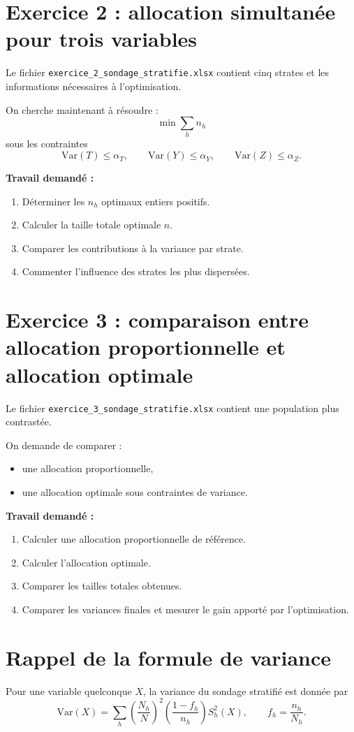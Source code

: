 \documentclass[11pt,a4paper]{article}
\begin{document}
\section{Exercice 2 : allocation simultanée pour trois variables}
Le fichier \texttt{exercice\_2\_sondage\_stratifie.xlsx} contient cinq strates et les informations nécessaires à l'optimisation.

On cherche maintenant à résoudre :
\[
\min \sum_h n_h
\]
sous les contraintes
\[
\mathrm{Var}(T) \leq \alpha_T, \qquad
\mathrm{Var}(Y) \leq \alpha_Y, \qquad
\mathrm{Var}(Z) \leq \alpha_Z.
\]

\textbf{Travail demandé :}
\begin{enumerate}[leftmargin=2em]
    \item Déterminer les $n_h$ optimaux entiers positifs.
    \item Calculer la taille totale optimale $n$.
    \item Comparer les contributions à la variance par strate.
    \item Commenter l'influence des strates les plus dispersées.
\end{enumerate}

\section{Exercice 3 : comparaison entre allocation proportionnelle et allocation optimale}
Le fichier \texttt{exercice\_3\_sondage\_stratifie.xlsx} contient une population plus contrastée.

On demande de comparer :
\begin{itemize}[leftmargin=2em]
    \item une allocation proportionnelle,
    \item une allocation optimale sous contraintes de variance.
\end{itemize}

\textbf{Travail demandé :}
\begin{enumerate}[leftmargin=2em]
    \item Calculer une allocation proportionnelle de référence.
    \item Calculer l'allocation optimale.
    \item Comparer les tailles totales obtenues.
    \item Comparer les variances finales et mesurer le gain apporté par l'optimisation.
\end{enumerate}

\section*{Rappel de la formule de variance}
Pour une variable quelconque $X$, la variance du sondage stratifié est donnée par
\[
\mathrm{Var}(X)
=
\sum_h
\left(\frac{N_h}{N}\right)^2
\left(\frac{1-f_h}{n_h}\right)
S_h^2(X),
\qquad
f_h = \frac{n_h}{N_h}.
\]
\end{document}
